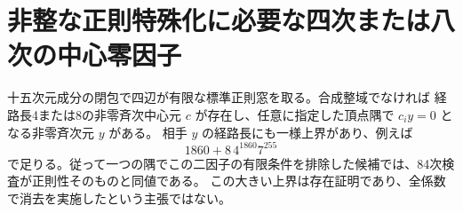 \section{非整な正則特殊化に必要な四次または八次の中心零因子}
\label{sec:finite-short-trace-pole}
\begin{theorem}\label{thm:finite-short-trace-pole}
十五次元成分の閉包で四辺が有限な標準正則窓を取る。合成整域でなければ
経路長4または8の非零斉次中心元 $c$ が存在し、任意に指定した頂点隅で $c_i y=0$ となる非零斉次元 $y$ がある。
相手 $y$ の経路長にも一様上界があり、例えば
\[
                       1860+8\,4^{1860}7^{255}
\]
で足りる。従って一つの隅でこの二因子の有限条件を排除した候補では、84次検査が正則性そのものと同値である。
この大きい上界は存在証明であり、全係数で消去を実施したという主張ではない。
\end{theorem}
